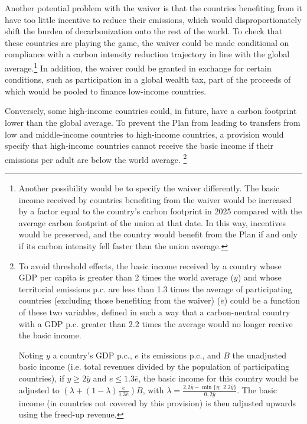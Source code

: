 \documentclass[a5paper,english,openany]{memoir}
\begin{document}
Another potential problem with the waiver is that the countries benefiting %
from it have too little incentive to reduce their emissions, which would disproportionately shift the burden of decarbonization %
onto the rest of the world. To check that these countries are playing the game, the waiver could be made conditional on compliance with a carbon intensity reduction trajectory in line with the global average.\footnote{Another possibility would be to specify the waiver differently. The basic income received by countries benefiting %
from the waiver would be increased by a factor equal to the country's carbon footprint in 2025 compared with the average carbon footprint of the union at that date. In this way, incentives would be preserved, and the country would benefit from the Plan if and only if its carbon intensity fell faster than the union average.} 
In addition, the waiver could be granted in exchange for certain conditions, such as participation in a global wealth tax, part of the proceeds of which would be pooled to finance low-income countries.

Conversely, some high-income countries could, in future, %
have a carbon footprint lower than the global average. To prevent the Plan from leading to transfers from low %
and middle-income countries to high-income countries, a provision would specify that high-income countries cannot receive the basic income if their emissions per adult are below the world average.%
\footnote{To avoid threshold effects, the basic income received by a country whose GDP per capita is greater than 2 times the world average ($\overline{y}$) and whose territorial emissions p.c. are less than 1.3 times the average of participating countries (excluding those benefiting from the waiver) ($\overline{e}$) could be a function of these two variables, defined in such a way that a carbon-neutral country with a GDP p.c. greater than 2.2 times the average would no longer receive the basic income. 

Noting $y$ a country's GDP p.c., $e$ its emissions p.c., and $B$ the unadjusted basic income (i.e. total revenues divided by the population of participating countries), if $y\geq 2\overline{y}$ and $e \leq 1.3 \overline{e}$, the basic income for this country would be adjusted to $\left(\lambda + \left(1-\lambda \right) \frac{e}{1.3\overline{e}} \right) B$, with $\lambda = \frac{2.2\overline{y}-\min\{y;\;2.2\overline{y}\}}{0,2\overline{y}}$. 
The basic income (in countries not covered by this provision) is then adjusted upwards using the freed-up revenue.} 
\end{document}
